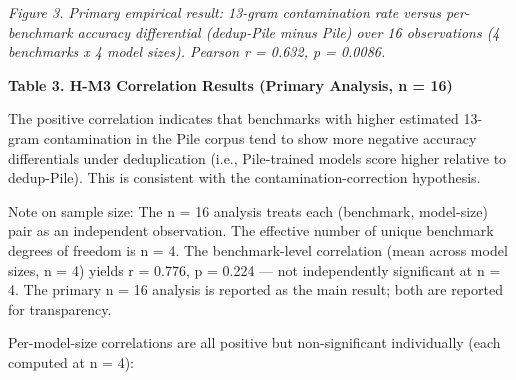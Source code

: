 \textit{Figure 3. Primary empirical result: 13-gram contamination rate versus per-benchmark accuracy differential (dedup-Pile minus Pile) over 16 observations (4 benchmarks x 4 model sizes). Pearson r = 0.632, p = 0.0086.}

\textbf{Table 3. H-M3 Correlation Results (Primary Analysis, n = 16)}

\begin{table}[htbp]
\centering
{}
\end{table}

The positive correlation indicates that benchmarks with higher estimated 13-gram contamination in the Pile corpus tend to show more negative accuracy differentials under deduplication (i.e., Pile-trained models score higher relative to dedup-Pile). This is consistent with the contamination-correction hypothesis.

Note on sample size: The n = 16 analysis treats each (benchmark, model-size) pair as an independent observation. The effective number of unique benchmark degrees of freedom is n = 4. The benchmark-level correlation (mean across model sizes, n = 4) yields r = 0.776, p = 0.224 --- not independently significant at n = 4. The primary n = 16 analysis is reported as the main result; both are reported for transparency.

Per-model-size correlations are all positive but non-significant individually (each computed at n = 4):

\begin{table}[htbp]
\centering
{}
\end{table}

